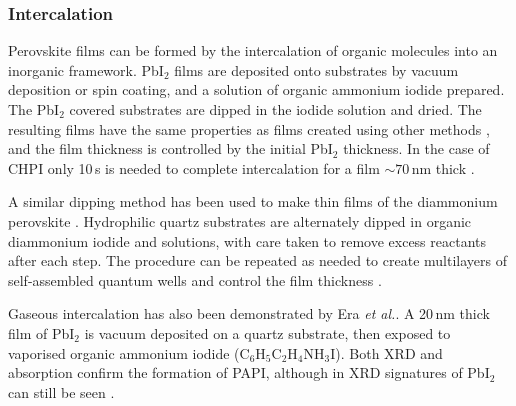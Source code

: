 \subsubsection{Intercalation}
Perovskite films can be formed by the intercalation of organic molecules into an inorganic framework. Pb$\textrm{I}_2$ films are deposited onto substrates by vacuum deposition or spin coating, and a solution of organic ammonium iodide prepared. The Pb$\textrm{I}_2$ covered substrates are dipped in the iodide solution and dried. The resulting films have the same properties as films created using other methods \cite{Liang1998}, and the film thickness is controlled by the initial Pb$\textrm{I}_2$ thickness. In the case of CHPI only 10\,s is needed to complete intercalation for a film $\sim70$\,nm thick \cite{Pradeesh2009a}.

A similar dipping method has been used to make thin films of the diammonium perovskite \mbox{}. Hydrophilic quartz substrates are alternately dipped in organic diammonium iodide and  solutions, with care taken to remove excess reactants after each step. The procedure can be repeated as needed to create multilayers of self-assembled quantum wells and control the film thickness \cite{Matsui2002}.

Gaseous intercalation has also been demonstrated by Era \textit{et al.}. A 20\,nm thick film of Pb$\textrm{I}_2$ is vacuum deposited on a quartz substrate, then exposed to vaporised organic ammonium iodide ($\textrm{C}_6\textrm{H}_5\textrm{C}_2\textrm{H}_4\textrm{NH}_3\textrm{I}$). Both XRD and absorption confirm the formation of PAPI, although in XRD signatures of Pb$\textrm{I}_2$ can still be seen \cite{Era1998}.


